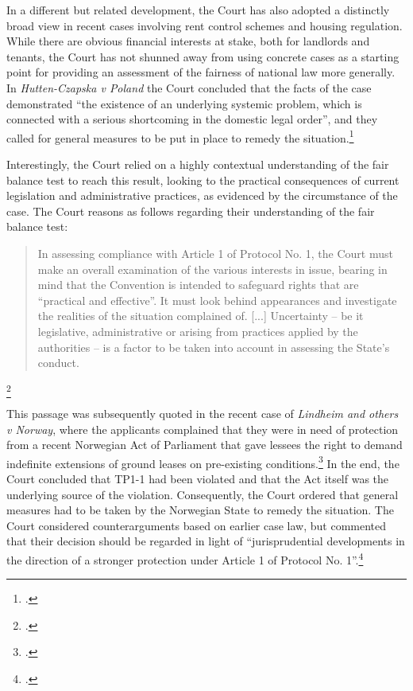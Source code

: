 In a different but related development, the Court has also adopted a distinctly broad view in recent cases involving rent control schemes and housing regulation. While there are obvious financial interests at stake, both for landlords and tenants, the Court has not shunned away from using concrete cases as a starting point for providing an assessment of the fairness of national law more generally. In {\it Hutten-Czapska v Poland} the Court concluded that the facts of the case demonstrated ``the existence of an underlying systemic problem, which is connected with a serious shortcoming in the domestic legal order'', and they called for general measures to be put in place to remedy the situation.\footcite[191]{hutten06}

Interestingly, the Court relied on a highly contextual understanding of the fair balance test to reach this result, looking to the practical consequences of current legislation and administrative practices, as evidenced by the circumstance of the case. The Court reasons as follows regarding their understanding of the fair balance test:

\begin{quote}
In assessing compliance with Article 1 of Protocol No. 1, the Court must make an overall examination of the various interests in issue, bearing in mind that the Convention is 	intended to safeguard rights that are ``practical and effective''. It must look behind 	appearances and investigate the realities of the situation complained of. [...] Uncertainty -- be it legislative, administrative or arising from practices applied by the authorities -- is a factor to be taken into account in assessing the State’s conduct.
\end{quote}\footcite[151]{hutten06}

This passage was subsequently quoted in the recent case of {\it Lindheim and others v Norway}, where the applicants complained that they were in need of protection from a recent Norwegian Act of Parliament that gave lessees the right to demand indefinite extensions of ground leases on pre-existing conditions.\footcite[119]{lindheim12}  In the end, the Court concluded that TP1-1 had been violated and that the Act itself was the underlying source of the violation. Consequently, the Court ordered that general measures had to be taken by the Norwegian State to remedy the situation. The Court considered counterarguments based on earlier case law, but commented that their decision should be regarded in light of ``jurisprudential developments in the direction of a stronger protection under Article 1 of Protocol No. 1''.\footcite[135]{lindheim12}

